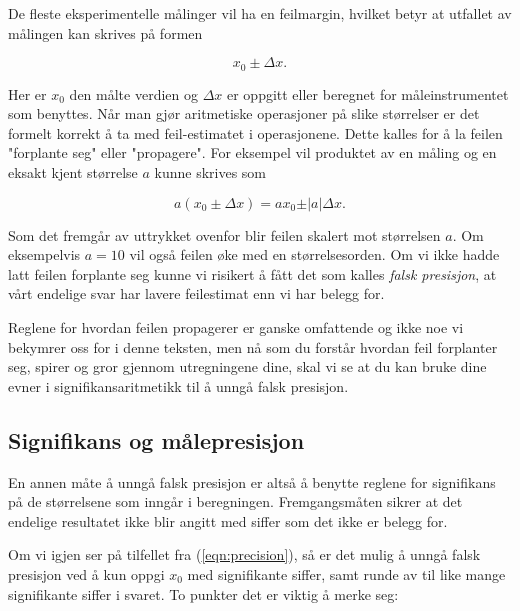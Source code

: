\documentclass[a4paper,9pt]{article}
\begin{document}
De fleste eksperimentelle målinger vil ha en feilmargin, hvilket betyr at utfallet av målingen kan skrives på formen 

\begin{equation}
\label{eqn:precision}
x_0 \pm \Delta x.
\end{equation}

Her er $x_0$ den målte verdien og $\Delta x$ er oppgitt eller beregnet for måleinstrumentet som benyttes.  Når man gjør aritmetiske operasjoner på slike størrelser er det formelt korrekt å ta med feil-estimatet i operasjonene. Dette kalles for å la feilen "forplante seg" eller "propagere". For eksempel vil produktet av en måling og en eksakt kjent størrelse $a$ kunne skrives som

\begin{equation}
\label{eqn:propagation}
a(x_0 \pm \Delta x)=ax_0 \pm \vert a \vert \Delta x.
\end{equation}

Som det fremgår av uttrykket ovenfor blir feilen skalert mot størrelsen $a$. Om eksempelvis $a=10$ vil også feilen øke med en størrelsesorden. Om vi ikke hadde latt feilen forplante seg kunne vi risikert å fått det som kalles \emph{falsk presisjon}, at vårt endelige svar har lavere feilestimat enn vi har belegg for.

\vspace{.5cm}

Reglene for hvordan feilen propagerer er ganske omfattende og ikke noe vi bekymrer oss for i denne teksten, men nå som du forstår hvordan feil forplanter seg, spirer og gror gjennom utregningene dine, skal vi se at du kan bruke dine evner i signifikansaritmetikk til å unngå falsk presisjon.

\subsection{Signifikans og målepresisjon}

En annen måte å unngå falsk presisjon er altså å benytte reglene for signifikans på de størrelsene som inngår i beregningen. Fremgangsmåten sikrer at det endelige resultatet ikke blir angitt med siffer som det ikke er belegg for.

\vspace{.5cm}

Om vi igjen ser på tilfellet fra (\ref{eqn:precision}), så er det mulig å unngå falsk presisjon ved å kun oppgi $x_0$ med signifikante siffer, samt runde av til like mange signifikante siffer i svaret. To punkter det er viktig å merke seg:
\end{document}
